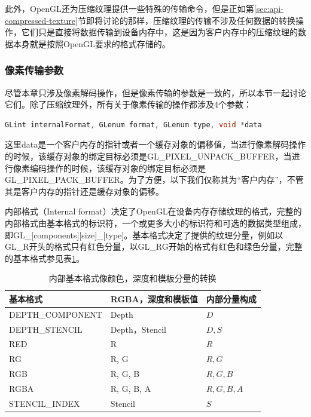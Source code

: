 此外，OpenGL还为压缩纹理提供一些特殊的传输命令，但是正如第\ref{sec:api-compressed-texture}节即将讨论的那样，压缩纹理的传输不涉及任何数据的转换操作，它们只是直接将数据传输到设备内存中，这是因为客户内存中的压缩纹理的数据本身就是按照OpenGL要求的格式存储的。





\subsubsection{像素传输参数}
尽管本章只涉及像素解码操作，但是像素传输的参数是一致的，所以本节一起讨论它们。除了压缩纹理外，所有关于像素传输的操作都涉及4个参数：

\begin{lstlisting}[language=C++]
GLint internalFormat, GLenum format​, GLenum type​, void *data​
\end{lstlisting}

这里data是一个客户内存的指针或者一个缓存对象的偏移值，当进行像素解码操作的时候，该缓存对象的绑定目标必须是GL\_PIXEL\_UNPACK\_BUFFER，当进行像素编码操作的时候，该缓存对象的绑定目标必须是GL\_PIXEL\_PACK\_BUFFER。为了方便，以下我们仅称其为“客户内存”，不管其是客户内存的指针还是缓存对象的偏移。

内部格式（Internal format）决定了OpenGL在设备内存存储纹理的格式，完整的内部格式由基本格式的标识符，一个或更多大小的标识符和可选的数据类型组成，即GL\_[components][size]\_[type]。基本格式决定了提供的纹理分量，例如以GL\_R开头的格式只有红色分量，以GL\_RG开始的格式有红色和绿色分量，完整的基本格式参见表\ref{t:api-texture-base-internal-format}。

\begin{table}
\caption{内部基本格式像颜色，深度和模板分量的转换}
\label{t:api-texture-base-internal-format}
\centering
\begin{tabular}{>{\small}p{}|>{\small}p{}|>{\small}p{}}
\hline 
   基本格式 & RGBA，深度和模板值 & 内部分量构成 \\
    \hline  
  DEPTH\_COMPONENT  &Depth           &$D$\\
  DEPTH\_STENCIL    &Depth，Stencil  &$D,S$\\
  RED               &R               &$R$\\
  RG                &R, G            &$R, G$\\
  RGB               &R, G, B         &$R, G,B$\\
  RGBA              &R, G, B, A      &$R, G, B, A$\\
  STENCIL\_INDEX    &Stencil         &$S$\\

 \hline 
\end{tabular}
\end{table}

